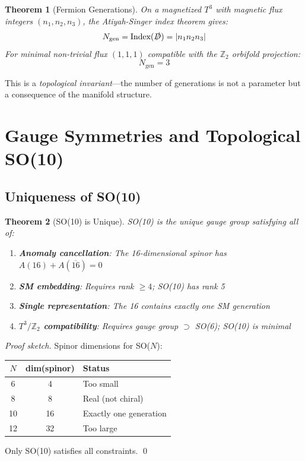 \documentclass[12pt,a4paper]{article}
\newtheorem{theorem}{Theorem}[section]
\begin{document}
\begin{theorem}[Fermion Generations]
On a magnetized $T^3$ with magnetic flux integers $(n_1, n_2, n_3)$, the Atiyah-Singer index theorem gives:
\begin{equation}
N_{\text{gen}} = \text{Index}(\slashed{D}) = |n_1 n_2 n_3|
\end{equation}
For minimal non-trivial flux $(1,1,1)$ compatible with the $\mathbb{Z}_2$ orbifold projection:
\begin{equation}
N_{\text{gen}} = 3
\end{equation}
\end{theorem}

This is a \textit{topological invariant}---the number of generations is not a parameter but a consequence of the manifold structure.

\section{Gauge Symmetries and Topological SO(10)}

\subsection{Uniqueness of SO(10)}

\begin{theorem}[SO(10) is Unique]
SO(10) is the unique gauge group satisfying all of:
\begin{enumerate}
    \item \textbf{Anomaly cancellation}: The 16-dimensional spinor has $A(16) + A(\overline{16}) = 0$
    \item \textbf{SM embedding}: Requires rank $\geq 4$; SO(10) has rank 5
    \item \textbf{Single representation}: The 16 contains exactly one SM generation
    \item \textbf{$T^3/\mathbb{Z}_2$ compatibility}: Requires gauge group $\supset$ SO(6); SO(10) is minimal
\end{enumerate}
\end{theorem}

\begin{proof}[Proof sketch]
Spinor dimensions for SO($N$):
\begin{center}
\begin{tabular}{c|c|l}
$N$ & dim(spinor) & Status \\\hline
6 & 4 & Too small \\
8 & 8 & Real (not chiral) \\
10 & 16 & Exactly one generation \\
12 & 32 & Too large
\end{tabular}
\end{center}
Only SO(10) satisfies all constraints. \qed
\end{proof}
\end{document}
